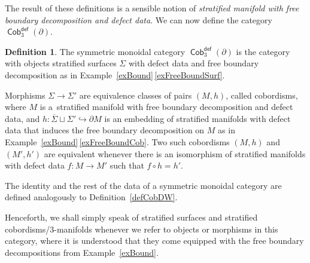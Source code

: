 \documentclass[pdftex]{sigma}
\DeclareMathOperator{\Cob}{\mathsf{Cob}}
\numberwithin{equation}{section}
\theoremstyle{definition}
\newtheorem{Definition}[Definition]{Definition}
\begin{document}
The result of these definitions is a sensible notion of \textit{stratified manifold with free boundary decomposition and defect data}. We can now define the category $\Cob_3^{\mathsf{def}}(\partial)$.
\begin{Definition}
 The symmetric monoidal category $\Cob_3^{\mathsf{def}}(\partial)$ is the category with objects stratified surfaces $\Sigma$ with defect data and free boundary decomposition as in Example~\ref{exBound}\,\ref{exFreeBoundSurf}.

 Morphisms $\Sigma \rightarrow \Sigma'$ are equivalence classes of pairs $(M, h)$, called cobordisms, where $M$ is a~stratified manifold with free boundary decomposition and defect data, and $h\colon \overline{\Sigma} \sqcup \Sigma' \hookrightarrow \partial M$ is an embedding of stratified manifolds with defect data that induces the free boundary decomposition on $M$ as in Example~\ref{exBound}\,\ref{exFreeBoundCob}. Two such cobordisms $(M, h)$ and $(M', h')$ are equivalent whenever there is an isomorphism of stratified manifolds with defect data $f\colon M \rightarrow M'$ such that $f \circ h = h'$.

 The identity and the rest of the data of a symmetric monoidal category are defined analogously to Definition~\ref{defCobDW}.
\end{Definition}

Henceforth, we shall simply speak of stratified surfaces and stratified cobordisms/3-manifolds whenever we refer to objects or morphisms in this category, where it is understood that they come equipped with the free boundary decompositions from Example~\ref{exBound}.
\end{document}
